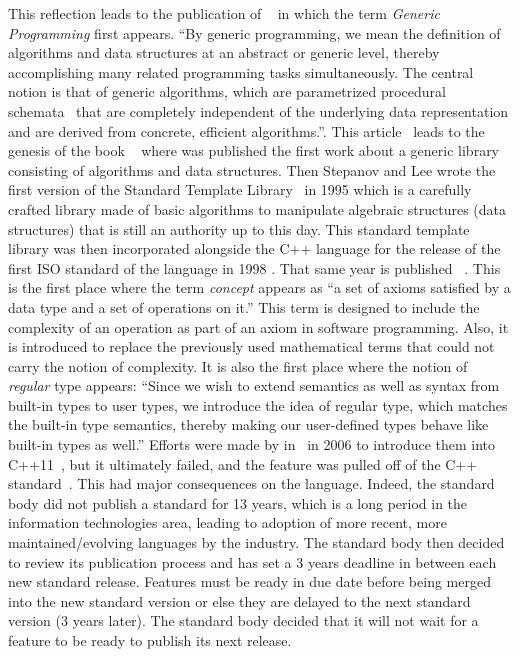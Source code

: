 This reflection leads to the publication of ~\parencite{musser.1988.generic} in which the
term \emph{Generic Programming} first appears. ``By generic programming, we mean the definition of algorithms and data
structures at an abstract or generic level, thereby accomplishing many related programming tasks simultaneously. The
central notion is that of generic algorithms, which are parametrized procedural
schemata~\parencite{goguen.1984.parametrized} that are completely independent of the underlying data representation and
are derived from concrete, efficient algorithms.''. This article~\parencite{musser.1988.generic} leads to the genesis of
the book ~\parencite{musser.1989.ada} where was published the first work about a generic
library consisting of algorithms and data structures. Then Stepanov and Lee wrote the first version of the Standard
Template Library~\parencite{stepanov.1995.standard} in 1995 which is a carefully crafted library made of basic
algorithms to manipulate algebraic structures (data structures) that is still an authority up to this day. This standard
template library was then incorporated alongside the C++ language for the release of the first ISO standard of the
language in 1998 \parencite{iso.1998.cpp}. That same year is published
~\parencite{dehnert.1998.fundamentals}. This is the first place where the term
\emph{concept} appears as ``a set of axioms satisfied by a data type and a set of operations on it.'' This term is
designed to include the complexity of an operation as part of an axiom in software programming. Also, it is introduced
to replace the previously used mathematical terms that could not carry the notion of complexity. It is also the first
place where the notion of \emph{regular} type appears: ``Since we wish to extend semantics as well as syntax from
built-in types to user types, we introduce the idea of regular type, which matches the built-in type semantics, thereby
making our user-defined types behave like built-in types as well.'' Efforts were made by
\citeauthor{gregor.2006.concepts-art} in~\parencite{gregor.2006.concepts-proc,gregor.2006.concepts-art} in 2006 to
introduce them into C++11~\parencite{iso.2011.cpp}, but it ultimately failed, and the feature was pulled off of the C++
standard~\parencite{seymour.2009.concepts}. This had major consequences on the language. Indeed, the standard body did
not publish a standard for 13 years, which is a long period in the information technologies area, leading to adoption of
more recent, more maintained/evolving languages by the industry. The standard body then decided to review its
publication process and has set a 3 years deadline in between each new standard release. Features must be ready in due
date before being merged into the new standard version or else they are delayed to the next standard version (3 years
later). The standard body decided that it will not wait for a feature to be ready to publish its next release.

